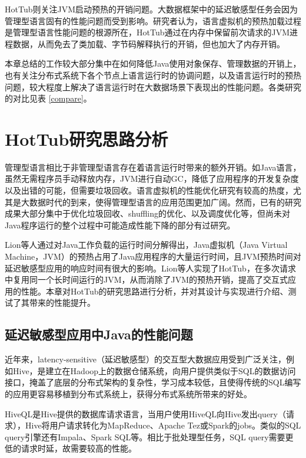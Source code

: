 \documentclass[lang=cn,12pt,a4paper,cite=authoryear]{elegantpaper}
\begin{document}
\begin{figure*}[!htp]

HotTub则关注JVM启动预热的开销问题。大数据框架中的延迟敏感型任务会因为管理型语言固有的性能问题而受到影响。研究者认为，语言虚拟机的预热加载过程是管理型语言性能问题的根源所在，HotTub通过在内存中保留前次请求的JVM进程数据，从而免去了类加载、字节码解释执行的开销，但也加大了内存开销。

本章总结的工作较大部分集中在如何降低Java使用对象保存、管理数据的开销上，也有关注分布式系统下各个节点上语言运行时的协调问题，以及语言运行时的预热问题，较大程度上解决了语言运行时在大数据场景下表现出的性能问题。各类研究的对比见表 \ref{compare}。

\section{HotTub研究思路分析}
管理型语言相比于非管理型语言存在着语言运行时带来的额外开销。如Java语言，虽然无需程序员手动释放内存，JVM进行自动GC，降低了应用程序的开发复杂度以及出错的可能，但需要垃圾回收。语言虚拟机的性能优化研究有较高的热度，尤其是大数据时代的到来，使得管理型语言的应用范围更加广阔。然而，已有的研究成果大部分集中于优化垃圾回收、shuffling的优化、以及调度优化等，但尚未对Java程序运行的整个过程中可能造成性能下降的部分有过研究。

Lion等人通过对Java工作负载的运行时间分解得出，Java虚拟机（Java Virtual Machine，JVM）的预热占用了Java应用程序的大量运行时间，且JVM预热时间对延迟敏感型应用的响应时间有很大的影响。Lion等人实现了HotTub\cite{DBLP:conf/osdi/LionCSZGY16}，在多次请求中复用同一个长时间运行的JVM，从而消除了JVM的预热开销，提高了交互式应用的性能。本章对HotTub的研究思路进行分析，并对其设计与实现进行介绍、测试了其带来的性能提升。

\subsection{延迟敏感型应用中Java的性能问题}
近年来，latency-sensitive（延迟敏感型）的交互型大数据应用受到广泛关注，例如Hive\cite{hive}，是建立在Hadoop上的数据仓储系统，向用户提供类似于SQL的数据访问接口，掩盖了底层的分布式架构的复杂性，学习成本较低，且使得传统的SQL编写的应用更容易移植到分布式系统上，获得分布式系统所带来的好处。

HiveQL是Hive提供的数据库请求语言，当用户使用HiveQL向Hive发出query（请求），Hive将用户请求转化为MapReduce、Apache Tez\cite{tez}或Spark的jobs。类似的SQL query引擎还有Impala\cite{impala}、Spark SQL\cite{DBLP:conf/sigmod/ArmbrustXLHLBMK15}等。相比于批处理型任务，SQL query需要更低的请求时延，故需要较高的性能。


\end{figure*}
\end{document}
